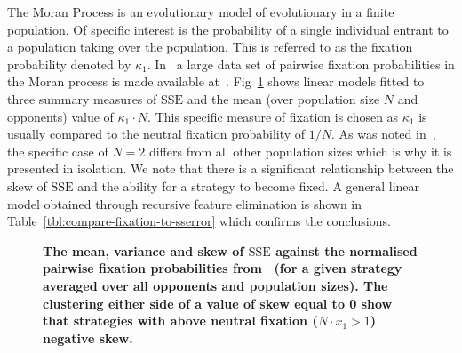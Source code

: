 \documentclass[10pt,letterpaper]{article}
\newcommand{\SSe}{\text{SSE}}
\begin{document}
The Moran Process is an evolutionary model of evolutionary in a finite
population. Of specific interest is the probability of a single 
individual entrant to a population taking over the population.
This is referred to as the fixation probability denoted by \(\kappa_1\).
In~\cite{Moran1707} a large data set of pairwise fixation probabilities in the
Moran process is made available at~\cite{vincent_knight_2017_1040129}.
Fig~\ref{fig:compare-fixation-to-sserror} shows linear models fitted to three
summary measures of \(\SSe\) and the mean (over population size \(N\) and
opponents) value of \(\kappa_1\cdot N\). This
specific measure of fixation is chosen as \(\kappa_1\) is usually compared to
the neutral fixation probability of \(1 / N\).  As was noted
in~\cite{Moran1707}, the specific case of \(N=2\) differs from all other
population sizes which is why it is presented in isolation.  We note that there
is a significant relationship between the skew of \(\SSe\) and the ability for a
strategy to become fixed.  A general linear model obtained through recursive
feature elimination is shown in Table~\ref{tbl:compare-fixation-to-sserror}
which confirms the conclusions.

\begin{figure}[!hbtp]
    \centering
    \caption{{\bf The mean, variance and skew of
    \(\SSe\) against the normalised pairwise fixation probabilities
    from~\cite{Moran1707} (for a given strategy averaged over all opponents and
    population sizes). The clustering either side of a value of skew equal to
    0 show that strategies with above neutral
    fixation (\(N\cdot x_1>1\)) negative skew.}}
    \label{fig:compare-fixation-to-sserror}
\end{figure}
\end{document}
